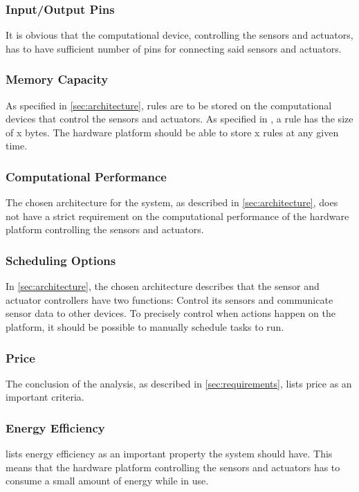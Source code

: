 \subsubsection{Input/Output Pins}
It is obvious that the computational device, controlling the sensors and actuators, has to have sufficient number of pins for connecting said sensors and actuators.

\subsubsection{Memory Capacity}
As specified in \cref{sec:architecture}, rules are to be stored on the computational devices that control the sensors and actuators. As specified in , a rule has the size of x  bytes. The hardware platform should be able to store x  rules at any given time.

\subsubsection{Computational Performance}
The chosen architecture for the system, as described in \cref{sec:architecture}, does not have a strict requirement on the computational performance of the hardware platform controlling the sensors and actuators.

\subsubsection{Scheduling Options}
In \cref{sec:architecture}, the chosen architecture describes that the sensor and actuator controllers have two functions: Control its sensors and communicate sensor data to other devices. To precisely control when actions happen on the platform, it should be possible to manually schedule tasks to run.

\subsubsection{Price}
The conclusion of the analysis, as described in \cref{sec:requirements}, lists price as an important criteria.

\subsubsection{Energy Efficiency}
 lists energy efficiency as an important property the system should have. This means that the hardware platform controlling the sensors and actuators has to consume a small amount of energy while in use.

